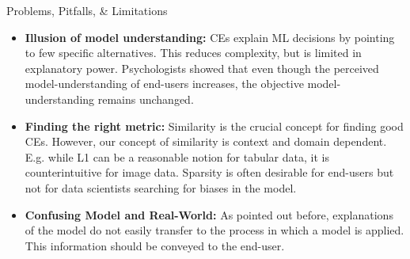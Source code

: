 \documentclass[11pt,compress,t,notes=noshow, xcolor=table]{beamer}
\begin{document}
\begin{vbframe}{Problems, Pitfalls, \& Limitations}
\begin{itemize}
    \item \textbf{Illusion of model understanding:} 
    CEs explain ML decisions by pointing to few specific alternatives. This reduces complexity, but is limited in explanatory power. Psychologists showed that even though the perceived model-understanding of end-users increases, the objective model-understanding remains unchanged.
    
    \item \textbf{Finding the right metric:} Similarity is the crucial concept for finding good CEs. However, our concept of similarity is context and domain dependent. E.g. while L1 can be a reasonable notion for tabular data, it is counterintuitive for image data. Sparsity is often desirable for end-users but not for data scientists searching for biases in the model.
    
    \item \textbf{Confusing Model and Real-World:} As pointed out before, explanations of the model do not easily transfer to the process in which a model is applied. This information should be conveyed to the end-user.
    

\end{itemize}
\end{vbframe}
\end{document}
